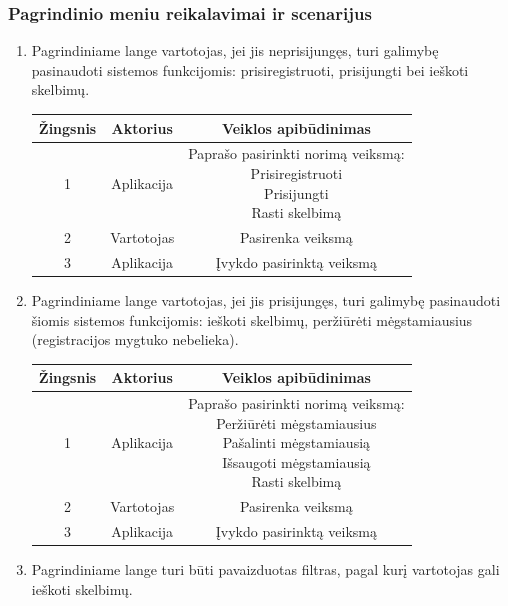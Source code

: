 \documentclass[12pt]{article}
\begin{document}
	\subsubsection{Pagrindinio meniu reikalavimai ir scenarijus}
	\begin{enumerate}
		\item Pagrindiniame lange vartotojas, jei jis neprisijungęs, turi galimybę pasinaudoti sistemos funkcijomis: prisiregistruoti, prisijungti bei ieškoti skelbimų.
		
		\begin{center}
		\begin{tabular}{ | c | c | c | }
			\hline
			Žingsnis & Aktorius   & Veiklos apibūdinimas \\ \hline
			1        & Aplikacija & \makecell{Paprašo pasirinkti norimą veiksmą: \\ Prisiregistruoti \\ Prisijungti \\ Rasti skelbimą} \\ \hline
			2        & Vartotojas & Pasirenka veiksmą \\ \hline
			3        & Aplikacija & Įvykdo pasirinktą veiksmą \\ \hline
		\end{tabular}
		\end{center}
		
		\item Pagrindiniame lange vartotojas, jei jis prisijungęs, turi galimybę pasinaudoti šiomis sistemos funkcijomis: ieškoti skelbimų, peržiūrėti mėgstamiausius (registracijos mygtuko nebelieka).
		
		\begin{center}
		\begin{tabular}{ | c | c | c | }
			\hline
			Žingsnis & Aktorius   & Veiklos apibūdinimas \\ \hline
			1        & Aplikacija & \makecell{Paprašo pasirinkti norimą veiksmą: \\ Peržiūrėti mėgstamiausius \\ Pašalinti mėgstamiausią \\ Išsaugoti mėgstamiausią \\ Rasti skelbimą} \\ \hline
			2        & Vartotojas & Pasirenka veiksmą \\ \hline
			3        & Aplikacija & Įvykdo pasirinktą veiksmą \\ \hline
		\end{tabular}
		\end{center}		
		
		\item Pagrindiniame lange turi būti pavaizduotas filtras, pagal kurį vartotojas gali ieškoti skelbimų.
	\end{enumerate}	
	\pagebreak
	
\end{document}
